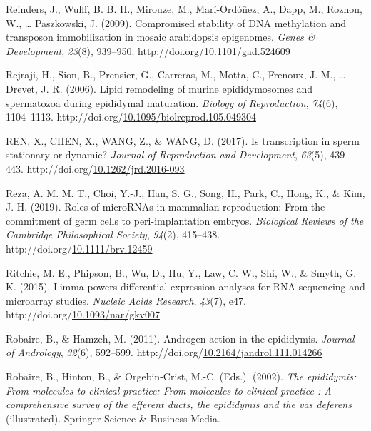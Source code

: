 \documentclass[12pt,twoside]{reedthesis}
\newlength{\cslhangindent}
\newenvironment{CSLReferences}[2] %
 {%
  \setlength{\parindent}{0pt}
  \ifodd #1 \everypar{\setlength{\hangindent}{\cslhangindent}}\ignorespaces\fi
  \ifnum #2 > 0
  \setlength{\parskip}{#2\baselineskip}
  \fi
 }%
 {}
\begin{document}
\begin{CSLReferences}{1}{0}
\leavevmode{}%
Reinders, J., Wulff, B. B. H., Mirouze, M., Marí-Ordóñez, A., Dapp, M., Rozhon, W., \ldots{} Paszkowski, J. (2009). Compromised stability of DNA methylation and transposon immobilization in mosaic arabidopsis epigenomes. \emph{Genes \& Development}, \emph{23}(8), 939--950. http://doi.org/\href{https://doi.org/10.1101/gad.524609}{10.1101/gad.524609}

\leavevmode{}%
Rejraji, H., Sion, B., Prensier, G., Carreras, M., Motta, C., Frenoux, J.-M., \ldots{} Drevet, J. R. (2006). Lipid remodeling of murine epididymosomes and spermatozoa during epididymal maturation. \emph{Biology of Reproduction}, \emph{74}(6), 1104--1113. http://doi.org/\href{https://doi.org/10.1095/biolreprod.105.049304}{10.1095/biolreprod.105.049304}

\leavevmode{}%
REN, X., CHEN, X., WANG, Z., \& WANG, D. (2017). Is transcription in sperm stationary or dynamic? \emph{Journal of Reproduction and Development}, \emph{63}(5), 439--443. http://doi.org/\href{https://doi.org/10.1262/jrd.2016-093}{10.1262/jrd.2016-093}

\leavevmode{}%
Reza, A. M. M. T., Choi, Y.-J., Han, S. G., Song, H., Park, C., Hong, K., \& Kim, J.-H. (2019). Roles of {microRNAs} in mammalian reproduction: From the commitment of germ cells to peri-implantation embryos. \emph{Biological Reviews of the Cambridge Philosophical Society}, \emph{94}(2), 415--438. http://doi.org/\href{https://doi.org/10.1111/brv.12459}{10.1111/brv.12459}

\leavevmode{}%
Ritchie, M. E., Phipson, B., Wu, D., Hu, Y., Law, C. W., Shi, W., \& Smyth, G. K. (2015). Limma powers differential expression analyses for RNA-sequencing and microarray studies. \emph{Nucleic Acids Research}, \emph{43}(7), e47. http://doi.org/\href{https://doi.org/10.1093/nar/gkv007}{10.1093/nar/gkv007}

\leavevmode{}%
Robaire, B., \& Hamzeh, M. (2011). Androgen action in the epididymis. \emph{Journal of Andrology}, \emph{32}(6), 592--599. http://doi.org/\href{https://doi.org/10.2164/jandrol.111.014266}{10.2164/jandrol.111.014266}

\leavevmode{}%
Robaire, B., Hinton, B., \& Orgebin-Crist, M.-C. (Eds.). (2002). \emph{The epididymis: From molecules to clinical practice: From molecules to clinical practice : A comprehensive survey of the efferent ducts, the epididymis and the vas deferens} (illustrated). Springer Science \& Business Media.


\end{CSLReferences}
\end{document}
